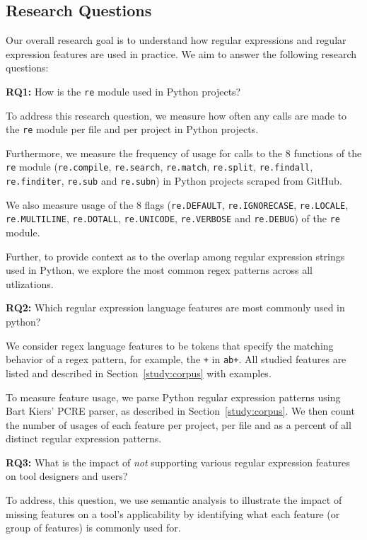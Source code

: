 \subsection{Research Questions}
Our overall research goal is to understand how regular expressions and regular expression features are used in practice. We aim to answer the following research questions:

\textbf{RQ1:} How  is the {\tt re} module used in Python projects?

To address this research question, we measure how often any calls are made to the {\tt re} module per file and per project in Python projects.

Furthermore, we measure the frequency of usage for calls to the 8 functions of the {\tt re} module ({\tt re.compile}, {\tt re.search}, {\tt re.match}, {\tt re.split}, {\tt re.findall}, {\tt re.finditer}, {\tt re.sub} and {\tt re.subn}) in Python projects scraped from GitHub.

We also measure usage of the 8 flags ({\tt re.DEFAULT}, {\tt re.IGNORECASE}, {\tt re.LOCALE}, {\tt re.MULTILINE}, {\tt re.DOTALL}, {\tt re.UNICODE}, {\tt re.VERBOSE} and {\tt re.DEBUG}) of the {\tt re} module.

Further, to provide context as to the overlap among regular expression strings used in Python, we explore the most common regex {patterns} across all utlizations.

\textbf{RQ2:} Which regular expression language features are most commonly used in python?

We consider regex language features to be tokens that specify the matching behavior of a regex pattern, for example,  the {\tt +} in {\tt ab+}.  All studied features are listed and described in Section~\ref{study:corpus} with examples.

To measure feature usage, we parse Python regular expression patterns using Bart Kiers' PCRE parser, as described in Section~\ref{study:corpus}.  We then count the number of usages of each feature per project, per file and as a percent of all distinct regular expression patterns.

\textbf{RQ3:} What is the impact of \emph{not} supporting various regular expression features on tool designers and users?

To address, this question, we use semantic analysis to illustrate the impact of missing features on a tool's applicability by identifying what each feature (or group of features) is commonly used for.


